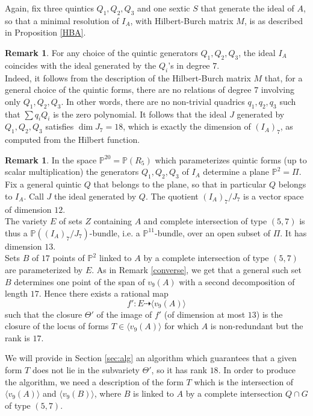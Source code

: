 \documentclass{amsart}
\newcommand{\Pj}{\mathbb{P}}
\theoremstyle{definition}
\newtheorem{rem0}[thm0]{Remark}
\begin{document}
Again, fix  three quintics $Q_1,Q_2,Q_3$ and one sextic $S$ that generate the ideal of $A$, so that a minimal resolution of $I_A$, with Hilbert-Burch matrix $M$,
is as described  in Proposition \ref{HBA}.

\begin{rem0}\label{ok5ic}
For any choice of the quintic generators $Q_1,Q_2,Q_3$, the ideal $I_A$ coincides with the ideal generated by the $Q_i$'s in degree $7$.\\
Indeed, it follows from the description of the Hilbert-Burch matrix $M$ that, for a general choice of the quintic forms, there are no relations of degree $7$
involving only $Q_1,Q_2,Q_3$. In other words, there are no non-trivial quadrics $q_1,q_2,q_3$ such that $\sum q_iQ_i$ is the zero polynomial.
It follows that the ideal $J$ generated by $Q_1,Q_2,Q_3$ satisfies $\dim J_7=18$, which is exactly the dimension of $(I_A)_7$, as computed from
the Hilbert function.
\end{rem0}

\begin{rem0}\label{17case} In the space $\Pj^{20}=\Pj(R_5)$ which parameterizes quintic forms (up to scalar multiplication) the generators 
$Q_1,Q_2,Q_3$ of $I_A$ determine a plane $\Pj^2=\Pi$. Fix a general quintic $Q$ that belongs to the plane, so that in particular 
$Q$ belongs to $I_A$. Call $J$ the ideal generated by $Q$. The quotient $(I_A)_7/J_7$ is a vector space of dimension  $12$. \\
The variety $E$ of sets $Z$ containing $A$ and complete  intersection of type $(5,7)$ is thus a  $\Pj((I_A)_7/J_7)$-bundle, 
i.e. a $\Pj^{11}$-bundle, over an open subset of $\Pi$. It has dimension $13$.
 \\
Sets $B$ of $17$ points of $\Pj^2$ linked to $A$ by  a complete  intersection of type $(5,7)$ are parameterized by $E$. 
As in Remark \ref{converse}, we get that a general such set $B$ determines one point of the span of $v_9(A)$ with a second decomposition 
of length $17$. Hence  there exists a rational map
 \begin{equation}\label{effe'} f':E \dasharrow \langle v_9(A) \rangle \end{equation}
 such that the closure $\Theta'$  of the image of $f'$ (of dimension at most $13$) is the closure of the locus of forms $T\in \langle v_9(A) \rangle$ for which $A$ is
 non-redundant but the rank is $17$.
\end{rem0}

We will provide in Section \ref{sec:alg} an algorithm which guarantees that a given form $T$ does not lie in the subvariety $\Theta'$, so it has rank $18$.
In order to produce the algorithm, we need a description of the form $T$ which is the intersection of $ \langle v_9(A) \rangle$ and  
$\langle v_9(B) \rangle$, where $B$  is  linked to $A$ by  a complete  intersection $Q\cap G$ of type $(5,7)$.
\smallskip
\end{document}
